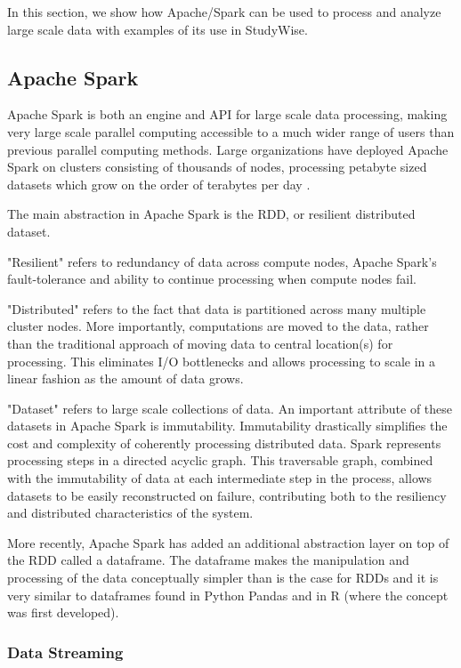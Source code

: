 \documentclass[runningheads,a4paper]{llncs}
\begin{document}
In this section, we show how Apache/Spark can be used to process and analyze large scale data with examples of its use in StudyWise.

\subsection{Apache Spark}

Apache Spark is both an engine and API for large scale data processing, making very large scale parallel computing accessible to a much wider range of users than previous parallel computing methods.  Large organizations have deployed Apache Spark on clusters consisting of thousands of nodes, processing petabyte sized datasets which grow on the order of terabytes per day \cite{Tsai2017}.

The main abstraction in Apache Spark is the RDD, or resilient distributed dataset.  

"Resilient" refers to redundancy of data across compute nodes, Apache Spark's fault-tolerance and ability to continue processing when compute nodes fail. 

"Distributed" refers to the fact that data is partitioned across many multiple cluster nodes. More importantly, computations are moved to the data, rather than the traditional approach of moving data to central location(s) for processing. This eliminates I/O bottlenecks and allows processing to scale in a linear fashion as the amount of data grows.

"Dataset" refers to large scale collections of data. An important attribute of these datasets in Apache Spark is immutability. Immutability drastically simplifies the cost and complexity of coherently processing distributed data. Spark represents processing steps in a directed acyclic graph. This traversable graph, combined with the immutability of data at each intermediate step in the process, allows datasets to be easily reconstructed on failure, contributing both to the resiliency and distributed characteristics of the system.

More recently, Apache Spark has added an additional abstraction layer on top of the RDD called a dataframe.  The dataframe makes the manipulation and processing of the data conceptually simpler than is the case for RDDs and it is very similar to dataframes found in Python Pandas and in R (where the concept was first developed).

\subsubsection{Data Streaming}
  
\end{document}
